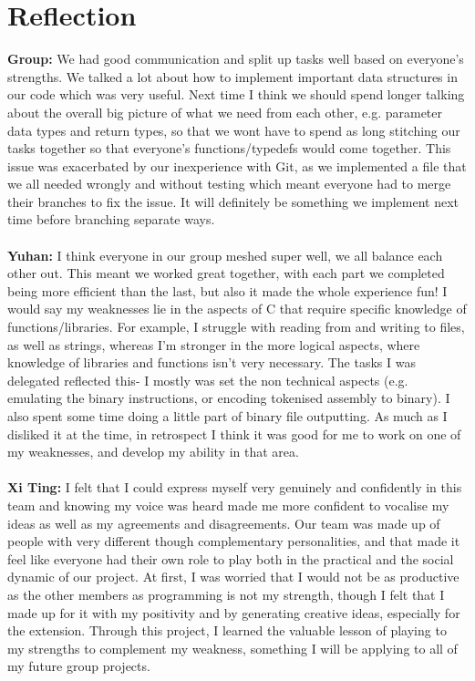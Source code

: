 \documentclass[11pt]{article}
\begin{document}
\section{Reflection}
\textbf{Group:} We had good communication and split up tasks well based on everyone's strengths. We talked a lot about how to implement important data structures in our code which was very useful. Next time I think we should spend longer talking about the overall big picture of what we need from each other, e.g. parameter data types and return types, so that we wont have to spend as long stitching our tasks together so that everyone's functions/typedefs would come together. This issue was exacerbated by our inexperience with Git, as we implemented a file that we all needed wrongly and without testing which meant everyone had to merge their branches to fix the issue. It will definitely be something we implement next time before branching separate ways.\\
\\
\textbf{Yuhan:} I think everyone in our group meshed super well, we all balance each other out. This meant we worked great together, with each part we completed being more efficient than the last, but also it made the whole experience fun! I would say my weaknesses lie in the aspects of C that require specific knowledge of functions/libraries. For example, I struggle with reading from and writing to files, as well as strings, whereas I’m stronger in the more logical aspects, where knowledge of libraries and functions isn’t very necessary. The tasks I was delegated reflected this- I mostly was set the non technical aspects (e.g. emulating the binary instructions, or encoding tokenised assembly to binary). I also spent some time doing a little part of binary file outputting. As much as I disliked it at the time, in retrospect I think it was good for me to work on one of my weaknesses, and develop my ability in that area.\\
\\
\textbf{Xi Ting:} I felt that I could express myself very genuinely and confidently in this team and knowing my voice was heard made me more confident to vocalise my ideas as well as my agreements and disagreements. Our team was made up of people with very different though complementary personalities, and that made it feel like everyone had their own role to play both in the practical and the social dynamic of our project. At first, I was worried that I would not be as productive as the other members as programming is not my strength, though I felt that I made up for it with my positivity and by generating creative ideas, especially for the extension. Through this project, I learned the valuable lesson of playing to my strengths to complement my weakness, something I will be applying to all of my future group projects.\\
\end{document}
